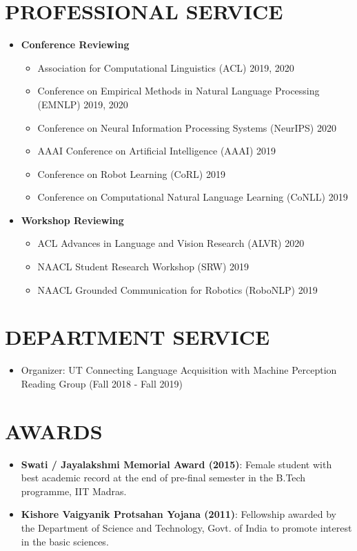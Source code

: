 \documentclass[letterpaper,10pt]{resume}
\begin{document}
{\section{PROFESSIONAL SERVICE}
\begin{itemize}
\item \textbf{Conference Reviewing}
\begin{itemize}
\item Association for Computational Linguistics (ACL) 2019, 2020
\item Conference on Empirical Methods in Natural Language Processing (EMNLP) 2019, 2020
\item Conference on Neural Information Processing Systems (NeurIPS) 2020
\item AAAI Conference on Artificial Intelligence (AAAI) 2019
\item Conference on Robot Learning (CoRL) 2019
\item Conference on Computational Natural Language Learning (CoNLL) 2019
\end{itemize}
\item \textbf{Workshop Reviewing}
\begin{itemize}
\item ACL Advances in Language and Vision Research (ALVR) 2020
\item NAACL Student Research Workshop (SRW) 2019
\item NAACL Grounded Communication for Robotics (RoboNLP) 2019
\end{itemize}
\end{itemize}
\vspace{0.2cm}

\section{DEPARTMENT SERVICE}
\begin{itemize}
\item Organizer: UT Connecting Language Acquisition with Machine Perception Reading Group (Fall 2018 - Fall 2019)
\end{itemize}
\vspace{0.2cm}

\section{AWARDS}
\begin{itemize}
\item \textbf{Swati / Jayalakshmi Memorial Award (2015)}: Female student with best academic record at the end of pre-final semester in the B.Tech programme, IIT Madras.
\item \textbf{Kishore Vaigyanik Protsahan Yojana (2011)}: Fellowship awarded by the Department of Science and Technology, Govt. of India to promote interest in the basic sciences.
\end{itemize}
\vspace{0.2cm}

}
\end{document}
